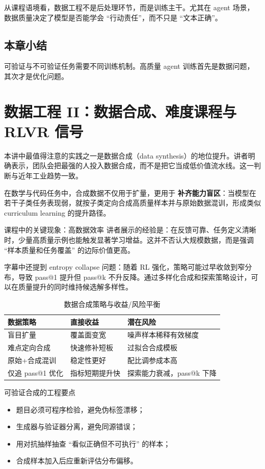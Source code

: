 \documentclass[a4paper]{article}
\begin{document}
从课程语境看，数据工程不是后处理环节，而是训练主干。尤其在 agent 场景，数据质量决定了模型是否能学会 ``行动责任''，而不只是 ``文本正确''。

\subsection{本章小结}
可验证与不可验证任务需要不同训练机制。高质量 agent 训练首先是数据问题，其次才是优化问题。

\section{数据工程 II：数据合成、难度课程与 RLVR 信号}

本讲中最值得注意的实践之一是数据合成（data synthesis）的地位提升。讲者明确表示，团队会把最强的人投入数据合成，而不是把它当成低价值流水线。这一判断与近年工业趋势一致。

在数学与代码任务中，合成数据不仅用于扩量，更用于 \textbf{补齐能力盲区}：当模型在若干子类任务表现弱，就按子类定向合成高质量样本并与原始数据混训，形成类似 curriculum learning 的提升路径。

\begin{importantbox}{课程中的关键现象：高数据效率}
讲者展示的经验是：在反馈可靠、任务定义清晰时，少量高质量示例也能触发显著学习增益。这并不否认大规模数据，而是强调 ``样本质量和任务覆盖'' 的边际价值更高。
\end{importantbox}

字幕中还提到 entropy collapse 问题：随着 RL 强化，策略可能过早收敛到窄分布，导致 pass@1 提升但 pass@k 不升反降。通过多样化合成和探索策略设计，可以在质量提升的同时维持候选解多样性。

\begin{table}[H]
\centering
\begin{tabular}{p{3.0cm}p{4.0cm}p{4.5cm}}
\toprule
\textbf{数据策略} & \textbf{直接收益} & \textbf{潜在风险} \\
\midrule
盲目扩量 & 覆盖面变宽 & 噪声样本稀释有效梯度 \\
难点定向合成 & 快速修补短板 & 过拟合合成模板 \\
原始+合成混训 & 稳定性更好 & 配比调参成本高 \\
仅追 pass@1 优化 & 指标短期提升快 & 探索能力衰减，pass@k 下降 \\
\bottomrule
\end{tabular}
\caption{数据合成策略与收益/风险平衡}
\end{table}

\begin{knowledgebox}{可验证合成的工程要点}
\begin{itemize}
    \item 题目必须可程序检验，避免伪标签漂移；
    \item 生成器与验证器分离，避免同源错误；
    \item 用对抗抽样抽查 ``看似正确但不可执行'' 的样本；
    \item 合成样本加入后应重新评估分布偏移。
\end{itemize}
\end{knowledgebox}
\end{document}
